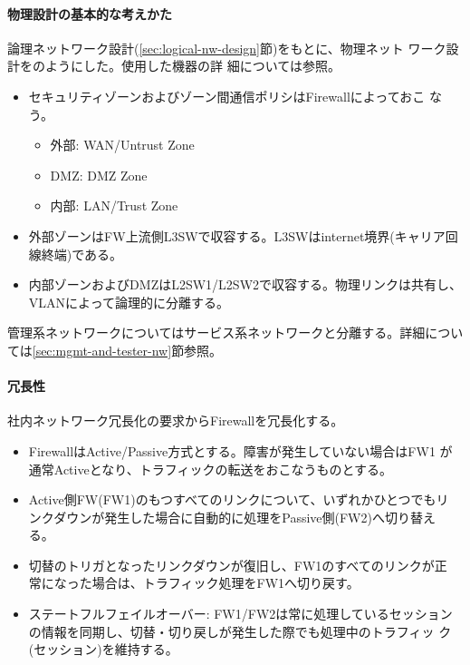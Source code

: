    \paragraph{物理設計の基本的な考えかた}
論理ネットワーク設計(\ref{sec:logical-nw-design}節)をもとに、物理ネット
ワーク設計をのようにした。使用した機器の詳
細については参照。
\begin{itemize}
 \item セキュリティゾーンおよびゾーン間通信ポリシはFirewallによっておこ
       なう。
       \begin{itemize}
        \item 外部: WAN/Untrust Zone
        \item DMZ: DMZ Zone
        \item 内部: LAN/Trust Zone
       \end{itemize}
 \item 外部ゾーンはFW上流側L3SWで収容する。L3SWはinternet境界(キャリア回
       線終端)である。
 \item 内部ゾーンおよびDMZはL2SW1/L2SW2で収容する。物理リンクは共有し、
       VLANによって論理的に分離する。
\end{itemize}

管理系ネットワークについてはサービス系ネットワークと分離する。詳細につい
ては\ref{sec:mgmt-and-tester-nw}節参照。

    \paragraph{冗長性}

社内ネットワーク冗長化の要求からFirewallを冗長化する。
\begin{itemize}
 \item FirewallはActive/Passive方式とする。障害が発生していない場合はFW1
       が通常Activeとなり、トラフィックの転送をおこなうものとする。
 \item Active側FW(FW1)のもつすべてのリンクについて、いずれかひとつでもリ
       ンクダウンが発生した場合に自動的に処理をPassive側(FW2)へ切り替え
       る。
 \item 切替のトリガとなったリンクダウンが復旧し、FW1のすべてのリンクが正
       常になった場合は、トラフィック処理をFW1へ切り戻す。
 \item ステートフルフェイルオーバー: FW1/FW2は常に処理しているセッション
       の情報を同期し、切替・切り戻しが発生した際でも処理中のトラフィッ
       ク(セッション)を維持する。
\end{itemize}

